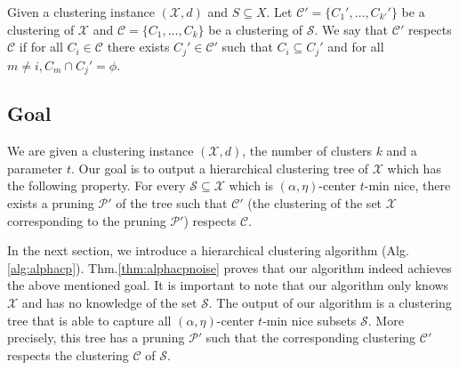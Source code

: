 \documentclass[11pt]{article}
\newcommand{\mc}{\mathcal}
\begin{document}

\begin{definition}[$\mc C'$ respects $\mc C$] Given a clustering instance $(\mc X, d)$ and $S \subseteq X$. Let $\mc C' = \{C_1', \ldots, C_{k'}'\}$ be a clustering of $\mc X$ and $\mc C = \{C_1, \ldots, C_k\}$ be a clustering of $\mc S$. We say that $\mc C'$ respects $\mc C$ if for all $C_i \in \mc C$ there exists $C_j' \in \mc C'$ such that $C_i \subseteq C_j'$ and for all $m \neq i, C_m \cap C_j' = \phi$.
\end{definition}

\subsection{Goal}
We are given a clustering instance $(\mc X, d)$, the number of clusters $k$ and a parameter $t$.
 Our goal is to output a hierarchical clustering tree of $\mc X$ which has the following property. For every $\mc S \subseteq \mc X$ which is $(\alpha, \eta)$-center $t$-min nice, there exists a pruning $\mc P'$ of the tree such that $\mc C'$ (the clustering of the set $\mc X$ corresponding to the pruning $\mc P'$) respects $\mc C$. 

In the next section, we introduce a hierarchical clustering algorithm (Alg.\ref{alg:alphacp}). Thm.\ref{thm:alphacpnoise} proves that our algorithm indeed achieves the above mentioned goal.
It is important to note that our algorithm only knows $\mc X$ and has no knowledge of the set $\mc S$.
The output of our algorithm is a clustering tree that is able to capture all $(\alpha, \eta)$-center $t$-min nice subsets $\mc S$. More precisely, this tree has a pruning $\mc P'$ such that the corresponding clustering $\mc C'$ respects the clustering $\mc C$ of $\mc S$. 
\end{document}
